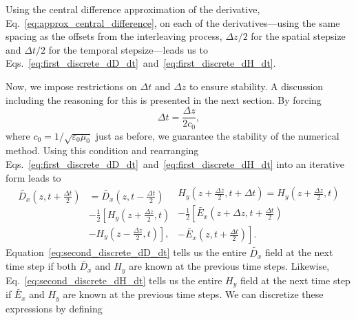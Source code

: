 \documentclass[12pt]{article}
\begin{document}
\begin{multicols}{2}
Using the central difference approximation of the derivative, Eq.~\ref{eq:approx_central_difference}, on each of the derivatives---using the same spacing as the offsets from the interleaving process, $\Delta z/2$ for the spatial stepsize and $\Delta t/2$ for the temporal stepsize---leads us to Eqs.~\ref{eq:first_discrete_dD_dt}~and~\ref{eq:first_discrete_dH_dt}.

Now, we impose restrictions on $\Delta t$ and $\Delta z$ to ensure stability. A discussion including the reasoning for this is presented in the next section. By forcing
\begin{equation}
\Delta t=\frac{\Delta z}{2c_0},
\end{equation}
 where $c_0=1/\sqrt{\varepsilon_0\mu_0}$ just as before, we guarantee the stability of the numerical method. Using this condition and rearranging Eqs.~\ref{eq:first_discrete_dD_dt}~and~\ref{eq:first_discrete_dH_dt} into an iterative form leads to
\begin{subequations}
\begin{equation}
\label{eq:second_discrete_dD_dt}\begin{split}
\tilde{D_x}\left(z,t+\frac{\Delta t}{2}\right)&=\tilde{D_x}\left(z,t-\frac{\Delta t}{2}\right) \\
&   -\frac{1}{2}\left[H_y\left(z+\frac{\Delta z}{2},t\right)\right. \\
&- \left. H_y\left(z-\frac{\Delta z}{2},t\right)\right],
\end{split}
\end{equation}
\begin{equation}
\label{eq:second_discrete_dH_dt}\begin{split}
H_y\left(z+\frac{\Delta z}{2},t+\Delta t\right)=H_y\left(z+\frac{\Delta z}{2},t\right) \\
     -\frac{1}{2}\left[\tilde{E_x}\left(z+\Delta z,t+\frac{\Delta t}{2}\right)\right. \\
\left. -\tilde{E_x}\left(z,t+\frac{\Delta t}{2}\right)\right].
\end{split}
\end{equation}
\end{subequations}
Equation~\ref{eq:second_discrete_dD_dt} tells us the entire $\tilde{D_x}$ field at the next time step if both $\tilde{D_x}$ and $H_y$ are known at the previous time steps. Likewise, Eq.~\ref{eq:second_discrete_dH_dt} tells us the entire $H_y$ field at the next time step if $\tilde{E_x}$ and $H_y$ are known at the previous time steps. We can discretize these expressions by defining

\end{multicols}
\end{document}
